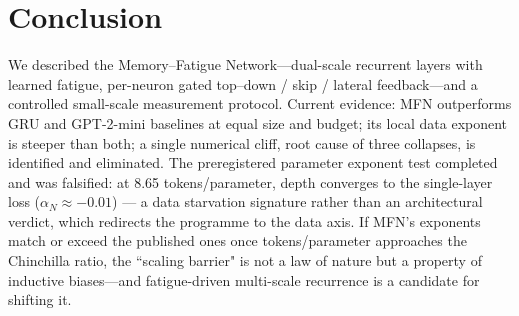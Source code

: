 \documentclass[11pt]{article}
\begin{document}
\section{Conclusion}\label{sec:conclusion}
We described the Memory--Fatigue Network---dual-scale recurrent layers with
learned fatigue, per-neuron gated top--down / skip / lateral feedback---and
a controlled small-scale measurement protocol. Current evidence: MFN
outperforms GRU and GPT-2-mini baselines at equal size and budget; its local
data exponent is steeper than both; a single numerical cliff, root cause of
three collapses, is identified and eliminated. The preregistered parameter
exponent test completed and was falsified: at 8.65 tokens/parameter, depth
converges to the single-layer loss ($\alpha_N \approx -0.01$) --- a data
starvation signature rather than an architectural verdict, which redirects
the programme to the data axis. If MFN's exponents match or exceed the
published ones once tokens/parameter approaches the Chinchilla ratio, the
``scaling barrier" is not a law of nature but a property of inductive
biases---and fatigue-driven multi-scale recurrence is a candidate for
shifting it.
\end{document}
